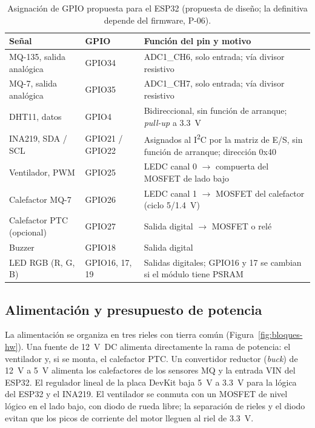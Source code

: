 \documentclass[manuscript,screen,nonacm,natbib=false]{acmart}
\newcommand{\IIC}{I\textsuperscript{2}C}
\begin{document}
\begin{table}[htbp]
\caption{Asignación de GPIO propuesta para el ESP32 (propuesta de diseño; la definitiva depende del firmware, P-06).}
\label{tab:gpio}
\footnotesize
\begin{tabularx}{\linewidth}{@{}P{3.4cm} P{2.4cm} Y@{}}
\toprule
Señal & GPIO & Función del pin y motivo \\
\midrule
MQ-135, salida analógica & GPIO34 & ADC1\_CH6, solo entrada; vía divisor resistivo \\
MQ-7, salida analógica & GPIO35 & ADC1\_CH7, solo entrada; vía divisor resistivo \\
DHT11, datos & GPIO4 & Bidireccional, sin función de arranque; \textit{pull-up} a 3.3~V \\
INA219, SDA / SCL & GPIO21 / GPIO22 & Asignados al \IIC{} por la matriz de E/S, sin función de arranque; dirección 0x40 \\
Ventilador, PWM & GPIO25 & LEDC canal 0 $\to$ compuerta del MOSFET de lado bajo \\
Calefactor MQ-7 & GPIO26 & LEDC canal 1 $\to$ MOSFET del calefactor (ciclo 5/1.4~V) \\
Calefactor PTC (opcional) & GPIO27 & Salida digital $\to$ MOSFET o relé \\
Buzzer & GPIO18 & Salida digital \\
LED RGB (R, G, B) & GPIO16, 17, 19 & Salidas digitales; GPIO16 y 17 se cambian si el módulo tiene PSRAM \\
\bottomrule
\end{tabularx}
\end{table}

\subsection{Alimentación y presupuesto de potencia}
\label{sec:potencia}
La alimentación se organiza en tres rieles con tierra común (Figura~\ref{fig:bloques-hw}). Una fuente de 12~V~DC alimenta directamente la rama de potencia: el ventilador y, si se monta, el calefactor PTC. Un convertidor reductor (\textit{buck}) de 12~V a 5~V alimenta los calefactores de los sensores MQ y la entrada VIN del ESP32. El regulador lineal de la placa DevKit baja 5~V a 3.3~V para la lógica del ESP32 y el INA219. El ventilador se conmuta con un MOSFET de nivel lógico en el lado bajo, con diodo de rueda libre; la separación de rieles y el diodo evitan que los picos de corriente del motor lleguen al riel de 3.3~V.
\end{document}
